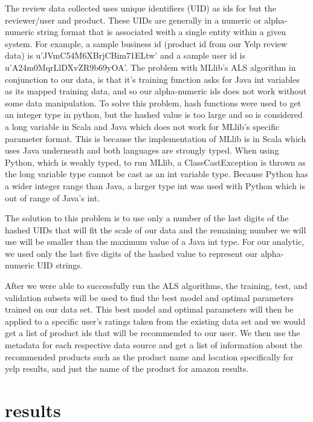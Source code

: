 \documentclass[conference]{IEEEtran}
\begin{document}
The review data collected uses unique identifiers (UID) as ids for but the reviewer/user and product.  These UIDs are generally in a numeric or alpha-numeric string format that is associated weith a single entity within a given system.  For example, a sample business id (product id from our Yelp review data) is u’JVmC54M6XBrjCBim71ELtw’ and a sample user id is u’A24m0MqrLlDXvZR9b69yOA’. 
The problem with MLlib's ALS algorithm in conjunction to our data, is that it's training function asks for Java int variables as its mapped training data, and so our alpha-numeric ids does not work without some data manipulation.  To solve this problem, hash functions were used to get an integer type in python, but the hashed value is too large and so is considered a long variable in Scala and Java which does not work for MLlib's specific parameter format.  This is because the implementation of MLlib is in Scala which uses Java underneath and both languages are strongly typed. When using Python, which is weakly typed, to run MLlib, a ClassCastException is thrown as the long variable type cannot be cast as an int variable type. Because Python has a wider integer range than Java, a larger type int was used with Python which is out of range of Java's int.

The solution to this problem is to use only a number of the last digits of the hashed UIDs that will fit the scale of our data and the remaining number we will use will be smaller than the maximum value of a Java int type.  For our analytic, we used only the last five digits of the hashed value to represent our alpha-numeric UID strings.   

After we were able to successfully run the ALS algorithms, the training, test, and validation subsets will be used to find the best model and optimal parameters trained on our data set.  This best model and optimal parameters will then be applied to a specific user's ratings taken from the existing data set and we would get a list of product ids that will be recommended to our user.  We then use the metadata for each respective data source and get a list of information about the recommended products such as the product name and location specifically for yelp results, and just the name of the product for amazon results.


\section{results}
\end{document}
